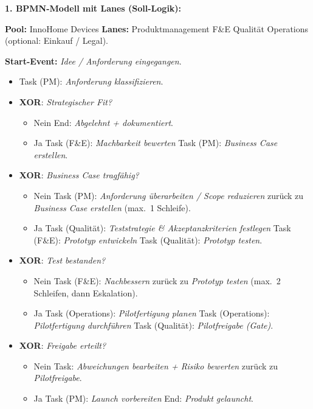 \documentclass[11pt,a4paper,oneside]{article}
\begin{document}
\begin{loesungbox}
\textbf{1. BPMN-Modell mit Lanes (Soll-Logik):}

\smallskip
\textbf{Pool:} InnoHome Devices \textendash{} \textbf{Lanes:} Produktmanagement \textperiodcentered{} F\&E \textperiodcentered{} Qualit\"at \textperiodcentered{} Operations \textperiodcentered{} (optional: Einkauf / Legal).

\smallskip
\textbf{Start-Event:} \emph{Idee / Anforderung eingegangen}.
\begin{itemize}
  \item Task (PM): \emph{Anforderung klassifizieren}.
  \item \textbf{XOR}: \emph{Strategischer Fit?}
  \begin{itemize}
    \item Nein \textrightarrow{} End: \emph{Abgelehnt + dokumentiert}.
    \item Ja \textrightarrow{} Task (F\&E): \emph{Machbarkeit bewerten} \textrightarrow{} Task (PM): \emph{Business Case erstellen}.
  \end{itemize}
  \item \textbf{XOR}: \emph{Business Case tragf\"ahig?}
  \begin{itemize}
    \item Nein \textrightarrow{} Task (PM): \emph{Anforderung \"uberarbeiten / Scope reduzieren} \textrightarrow{} zur\"uck zu \emph{Business Case erstellen} (max.\ 1 Schleife).
    \item Ja \textrightarrow{} Task (Qualit\"at): \emph{Teststrategie \& Akzeptanzkriterien festlegen} \textrightarrow{} Task (F\&E): \emph{Prototyp entwickeln} \textrightarrow{} Task (Qualit\"at): \emph{Prototyp testen}.
  \end{itemize}
  \item \textbf{XOR}: \emph{Test bestanden?}
  \begin{itemize}
    \item Nein \textrightarrow{} Task (F\&E): \emph{Nachbessern} \textrightarrow{} zur\"uck zu \emph{Prototyp testen} (max.\ 2 Schleifen, dann Eskalation).
    \item Ja \textrightarrow{} Task (Operations): \emph{Pilotfertigung planen} \textrightarrow{} Task (Operations): \emph{Pilotfertigung durchf\"uhren} \textrightarrow{} Task (Qualit\"at): \emph{Pilotfreigabe (Gate)}.
  \end{itemize}
  \item \textbf{XOR}: \emph{Freigabe erteilt?}
  \begin{itemize}
    \item Nein \textrightarrow{} Task: \emph{Abweichungen bearbeiten + Risiko bewerten} \textrightarrow{} zur\"uck zu \emph{Pilotfreigabe}.
    \item Ja \textrightarrow{} Task (PM): \emph{Launch vorbereiten} \textrightarrow{} End: \emph{Produkt gelauncht}.
  \end{itemize}
\end{itemize}


\end{loesungbox}
\end{document}
